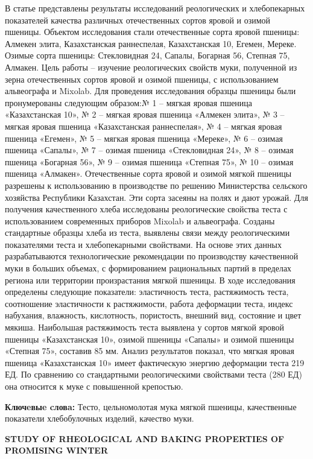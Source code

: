 {{В статье представлены результаты исследований реологических и
хлебопекарных показателей качества различных отечественных сортов яровой
и озимой пшеницы. Объектом исследования стали отечественные сорта яровой
пшеницы: Алмекен элита, Казахстанская раннеспелая, Казахстанская 10,
Егемен, Мереке. Озимые сорта пшеницы: Стекловидная 24, Сапалы, Богарная
56, Степная 75, Алмакен. Цель работы -- изучение реологических свойств
муки, полученной из зерна отечественных сортов яровой и озимой пшеницы,
с использованием альвеографа и Mixolab. Для проведения исследования
образцы пшеницы были пронумерованы следующим образом:№ 1 -- мягкая
яровая пшеница «Казахстанская 10», № 2 -- мягкая яровая пшеница «Алмекен
элита», № 3 -- мягкая яровая пшеница «Казахстанская раннеспелая», № 4 --
мягкая яровая пшеница «Егемен», № 5 -- мягкая яровая пшеница «Мереке», №
6 -- озимая пшеница «Сапалы», № 7 -- озимая пшеница «Стекловидная 24», №
8 -- озимая пшеница «Богарная 56», № 9 -- озимая пшеница «Степная 75», №
10 -- озимая пшеница «Алмакен». Отечественные сорта яровой и озимой
мягкой пшеницы разрешены к использованию в производстве по решению
Министерства сельского хозяйства Республики Казахстан. Эти сорта засеяны
на полях и дают урожай. Для получения качественного хлеба исследованы
реологические свойства теста с использованием современных приборов
Mixolab и альвеографа. Созданы стандартные образцы хлеба из теста,
выявлены связи между реологическими показателями теста и хлебопекарными
свойствами. На основе этих данных разрабатываются технологические
рекомендации по производству качественной муки в больших объемах, с
формированием рациональных партий в пределах региона или территории
произрастания мягкой пшеницы. В ходе исследования определены следующие
показатели: эластичность теста, растяжимость теста, соотношение
эластичности к растяжимости, работа деформации теста, индекс набухания,
влажность, кислотность, пористость, внешний вид, состояние и цвет
мякиша. Наибольшая растяжимость теста выявлена у сортов мягкой яровой
пшеницы «Казахстанская 10», озимой пшеницы «Сапалы» и озимой пшеницы
«Степная 75», составив 85 мм. Анализ результатов показал, что мягкая
яровая пшеница «Казахстанская 10» имеет фактическую энергию деформации
теста 219 ЕД. По сравнению со стандартными реологическими свойствами
теста (280 ЕД) она относится к муке с повышенной крепостью.

{\bfseries Ключeвыe cловa:} Тесто, цельномолотая мука мягкой пшеницы,
качественные показатели хлебобулочных изделий, качество муки.

{\bfseries STUDY OF RHEOLOGICAL AND BAKING PROPERTIES OF PROMISING WINTER}

}}
